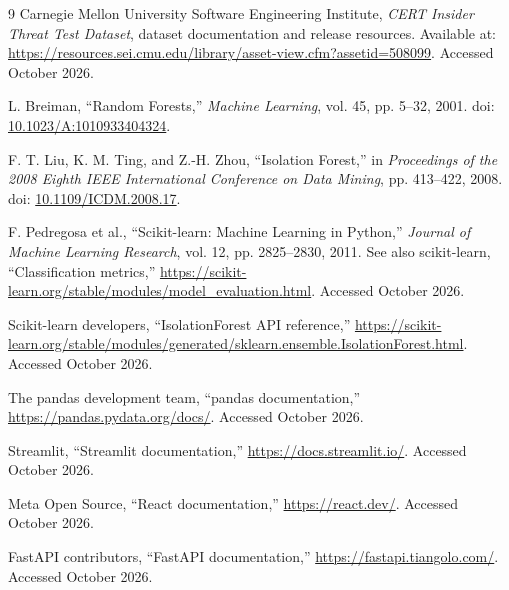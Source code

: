 \documentclass[12pt,a4paper,oneside]{report}
\begin{document}
\renewcommand{\bibname}{References}
\clearpage
{}
{}
\begin{thebibliography}{9}
Carnegie Mellon University Software Engineering Institute,
\emph{CERT Insider Threat Test Dataset}, dataset documentation and
release resources. Available at:
\url{https://resources.sei.cmu.edu/library/asset-view.cfm?assetid=508099}.
Accessed October 2026.

L. Breiman, ``Random Forests,'' \emph{Machine Learning}, vol. 45,
pp. 5--32, 2001. doi: \href{https://doi.org/10.1023/A:1010933404324}
{10.1023/A:1010933404324}.

F. T. Liu, K. M. Ting, and Z.-H. Zhou, ``Isolation Forest,'' in
\emph{Proceedings of the 2008 Eighth IEEE International Conference on
Data Mining}, pp. 413--422, 2008.
doi: \href{https://doi.org/10.1109/ICDM.2008.17}{10.1109/ICDM.2008.17}.

F. Pedregosa et al., ``Scikit-learn: Machine Learning in Python,''
\emph{Journal of Machine Learning Research}, vol. 12, pp. 2825--2830,
2011. See also scikit-learn, ``Classification metrics,''
\url{https://scikit-learn.org/stable/modules/model_evaluation.html}.
Accessed October 2026.

Scikit-learn developers, ``IsolationForest API reference,''
\url{https://scikit-learn.org/stable/modules/generated/sklearn.ensemble.IsolationForest.html}.
Accessed October 2026.

The pandas development team, ``pandas documentation,''
\url{https://pandas.pydata.org/docs/}. Accessed October 2026.

Streamlit, ``Streamlit documentation,''
\url{https://docs.streamlit.io/}. Accessed October 2026.

Meta Open Source, ``React documentation,''
\url{https://react.dev/}. Accessed October 2026.

FastAPI contributors, ``FastAPI documentation,''
\url{https://fastapi.tiangolo.com/}. Accessed October 2026.
\end{thebibliography}
\end{document}

